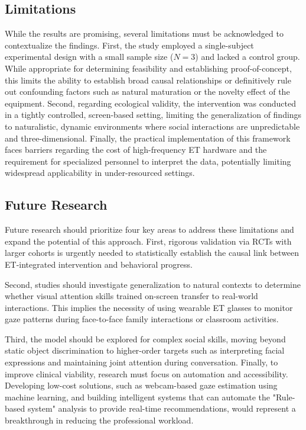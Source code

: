 \subsection{Limitations}
While the results are promising, several limitations must be acknowledged to contextualize the findings. First, the study employed a single-subject experimental design with a small sample size ($N=3$) and lacked a control group. While appropriate for determining feasibility and establishing proof-of-concept, this limits the ability to establish broad causal relationships or definitively rule out confounding factors such as natural maturation or the novelty effect of the equipment. Second, regarding ecological validity, the intervention was conducted in a tightly controlled, screen-based setting, limiting the generalization of findings to naturalistic, dynamic environments where social interactions are unpredictable and three-dimensional. Finally, the practical implementation of this framework faces barriers regarding the cost of high-frequency ET hardware and the requirement for specialized personnel to interpret the data, potentially limiting widespread applicability in under-resourced settings.

\subsection{Future Research}
Future research should prioritize four key areas to address these limitations and expand the potential of this approach. First, rigorous validation via RCTs with larger cohorts is urgently needed to statistically establish the causal link between ET-integrated intervention and behavioral progress. 

Second, studies should investigate generalization to natural contexts to determine whether visual attention skills trained on-screen transfer to real-world interactions. This implies the necessity of using wearable ET glasses to monitor gaze patterns during face-to-face family interactions or classroom activities.

Third, the model should be explored for complex social skills, moving beyond static object discrimination to higher-order targets such as interpreting facial expressions and maintaining joint attention during conversation. Finally, to improve clinical viability, research must focus on automation and accessibility. Developing low-cost solutions, such as webcam-based gaze estimation using machine learning, and building intelligent systems that can automate the "Rule-based system" analysis to provide real-time recommendations, would represent a breakthrough in reducing the professional workload.


